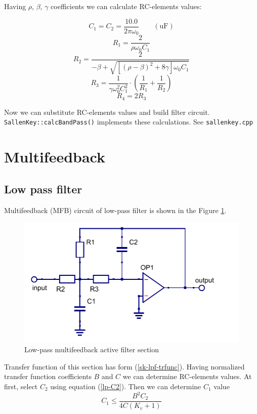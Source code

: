 Having $\rho$, $\beta$, $\gamma$ coefficients we can calculate RC-elements 
values:

\begin{equation}
 C_1=C_2=\frac{10.0}{2\pi\omega_0}\qquad(\mbox{uF})
\end{equation}
\begin{equation}
 R_1 = \frac{2}{\rho\omega_0C_1}
\end{equation}
\begin{equation}
 R_2=\frac{2}{-\beta+\sqrt{[(\rho-\beta)^2+8\gamma]\omega_0C_1}}
\end{equation}
\begin{equation}
 R_3 = 
\frac{1}{\gamma\omega_0^2C_1^2}\cdot\left(\frac{1}{R_1}+\frac{1}{R_2}\right)
\end{equation}
\begin{equation}
 R_4=2R_3
\end{equation}

Now we can substitute RC-elements values and build filter circuit. 
\verb|SallenKey::calcBandPass()| implements these calculations. See 
\verb|sallenkey.cpp|


\section{Multifeedback}

\subsection{Low pass filter}

Multifeedback (MFB) circuit of low-pass filter is shown in the Figure
\ref{fig:mfb-lpf}. 

\begin{figure}[!ht]
  \centering
  \includegraphics[width=0.6\linewidth]{pics/mfb-lpf}
  \caption{Low-pass multifeedback active filter section}
  \label{fig:mfb-lpf}
\end{figure}

Transfer function of this section has form (\ref{sk-lpf-trfunc}). Having
normalized transfer function coefficients $B$ and $C$ we can determine
RC-elements values. At first, select $C_2$ using equation (\ref{lp-C2}). Then
we can determine $C_1$ value
\begin{equation}
 C_1\leq\frac{B^2C_2}{4C(K_v+1)}
\end{equation}

